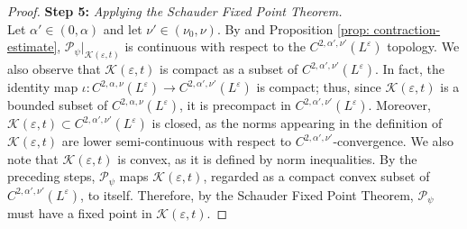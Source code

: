 \documentclass[11pt]{amsart}
\theoremstyle{definition}
\theoremstyle{remark}
\begin{document}
\begin{proof}
\noindent
    \textbf{Step 5:} \emph{Applying the Schauder Fixed Point Theorem.}\\

Let $\alpha'\in (0,\alpha)$ and let $\nu'\in (\nu_0,\nu)$.
By \cite[Theorem 2.3]{Sm93} and Proposition \ref{prop: contraction-estimate}, $\mathcal{P}_\psi\vert_{\mathscr{K}(\varepsilon, t)}$ is continuous with respect to the $C^{2,\alpha', \nu'}(L^\varepsilon)$ topology. We also observe that $\mathscr{K}(\varepsilon,t)$ is compact as a subset of $C^{2,\alpha', \nu'}(L^\varepsilon)$. In fact, the identity map $\iota: C^{2,\alpha, \nu}(L^\varepsilon)\to C^{2,\alpha', \nu'}(L^\varepsilon)$ is compact; thus, since $\mathscr{K}(\varepsilon, t)$ is a bounded subset of $C^{2,\alpha, \nu}(L^\varepsilon)$, it is precompact in $C^{2,\alpha', \nu'}(L^\varepsilon)$. Moreover, $\mathscr{K}(\varepsilon, t)\subset C^{2,\alpha', \nu'}(L^\varepsilon)$ is closed, as the norms appearing in the definition of $\mathscr{K}(\varepsilon, t)$ are lower semi-continuous with respect to $C^{2,\alpha', \nu'}$-convergence. We also note that $\mathscr{K}(\varepsilon, t)$ is convex, as it is defined by norm inequalities.
By the preceding steps, $\mathcal{P}_\psi$ maps $\mathscr{K}(\varepsilon, t)$, regarded as a compact convex subset of $C^{2,\alpha', \nu'}(L^\varepsilon)$, to itself. Therefore, by the Schauder Fixed Point Theorem, $\mathcal{P}_\psi$ must have a fixed point in $\mathscr{K}(\varepsilon,t)$.
\end{proof}
\end{document}
